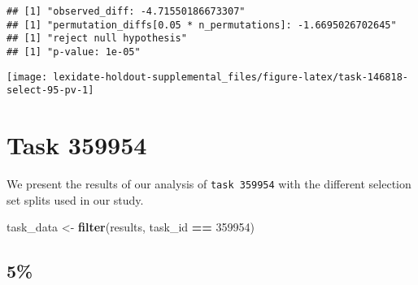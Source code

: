 \documentclass[
]{book}
\newenvironment{Shaded}{\begin{snugshade}}{\end{snugshade}}
\newcommand{\AttributeTok}[1]{\textcolor[rgb]{0.13,0.29,0.53}{#1}}
\newcommand{\DecValTok}[1]{\textcolor[rgb]{0.00,0.00,0.81}{#1}}
\newcommand{\FunctionTok}[1]{\textcolor[rgb]{0.13,0.29,0.53}{\textbf{#1}}}
\newcommand{\NormalTok}[1]{#1}
\newcommand{\OtherTok}[1]{\textcolor[rgb]{0.56,0.35,0.01}{#1}}
\newcommand{\SpecialCharTok}[1]{\textcolor[rgb]{0.81,0.36,0.00}{\textbf{#1}}}
\newcommand{\StringTok}[1]{\textcolor[rgb]{0.31,0.60,0.02}{#1}}
\begin{document}
\begin{Shaded}
\end{Shaded}

\begin{verbatim}
## [1] "observed_diff: -4.71550186673307"
## [1] "permutation_diffs[0.05 * n_permutations]: -1.6695026702645"
## [1] "reject null hypothesis"
## [1] "p-value: 1e-05"
\end{verbatim}

\texttt{[image: lexidate-holdout-supplemental\_files/figure-latex/task-146818-select-95-pv-1]}

\hypertarget{task-359954}{%
\chapter{Task 359954}\label{task-359954}}

We present the results of our analysis of \texttt{task\ 359954} with the different selection set splits used in our study.

\begin{Shaded}
\begin{Highlighting}[]
\NormalTok{task\_data }\OtherTok{\textless{}{-}} \FunctionTok{filter}\NormalTok{(results, task\_id }\SpecialCharTok{==} \DecValTok{359954}\NormalTok{)}
\end{Highlighting}
\end{Shaded}

\hypertarget{section-5}{%
\section{5\%}\label{section-5}}
\end{document}
